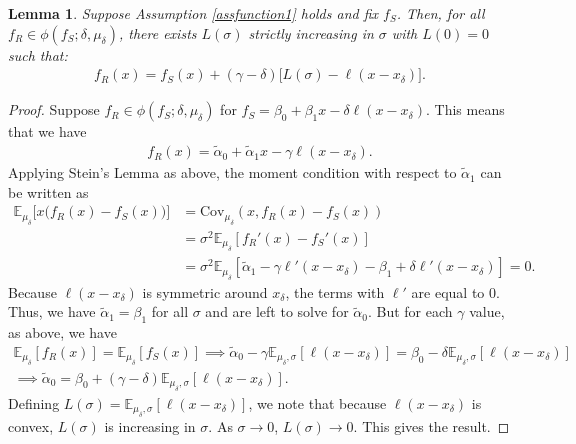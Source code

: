 \documentclass[11pt,dvipsnames]{article}
\newtheorem{lemma}{Lemma}
\newcommand{\Cov}{\mathrm{Cov}}
\begin{document}
\begin{appendix}
\begin{lemma}
Suppose Assumption \ref{assfunction1} holds and fix $f_S$.
Then, for all $f_R \in \phi(f_S;\delta,\mu_\delta)$, there exists $L(\sigma)$ strictly increasing in $\sigma$ with $L(0) = 0$ such that:
\begin{align*}
f_R(x) = f_S(x)+(\gamma-\delta)\big[L(\sigma)-\ell(x-x_\delta)\big].
\end{align*}
\end{lemma}
\begin{proof}
Suppose $f_R \in \phi(f_S;\delta,\mu_\delta)$ for $f_S = \beta_0+\beta_1x-\delta\ell(x-x_\delta)$.
This means that we have
\begin{align*}
f_R(x) = \tilde{\alpha}_0 + \tilde{\alpha}_1 x-\gamma\ell(x-x_\delta).
\end{align*}
Applying Stein's Lemma as above, the moment condition with respect to $\tilde{\alpha}_1$ can be written as
\begin{align*}
\mathbb{E}_{\mu_\delta}\big[x\big(f_R(x)-f_S(x) \big)\big]
&= \Cov_{\mu_\delta}(x,f_R(x)-f_S(x))
\\
&=
\sigma^2 \mathbb{E}_{\mu_\delta}[f_R'(x)-f_S'(x)]
\\
&=
\sigma^2 \mathbb{E}_{\mu_\delta}[\tilde{\alpha}_1-\gamma\ell'(x-x_\delta)-\beta_1+\delta\ell'(x-x_\delta)]
= 0.
\end{align*}
Because $\ell(x-x_\delta)$ is symmetric around $x_\delta$, the terms with $\ell'$ are equal to $0$.
Thus, we have $\tilde{\alpha}_1 = \beta_1$ for all $\sigma$ and are left to solve for $\tilde{\alpha}_0$.
But for each $\gamma$ value, as above, we have
\begin{align*}
\mathbb{E}_{\mu_\delta}[f_R(x)]=\mathbb{E}_{\mu_\delta}[f_S(x)]
\implies
\tilde{\alpha}_0 - \gamma\mathbb{E}_{\mu_\delta,\sigma}[\ell(x-x_\delta)]
= \beta_0 - \delta\mathbb{E}_{\mu_\delta,\sigma}[\ell(x-x_\delta)]
\\
\implies
\tilde{\alpha}_0 = \beta_0 + (\gamma-\delta)\mathbb{E}_{\mu_\delta,\sigma}[\ell(x-x_\delta)].
\end{align*}
Defining $L(\sigma) = \mathbb{E}_{\mu_\delta,\sigma}[\ell(x-x_\delta)]$, we note that because $\ell(x-x_\delta)$ is convex, $L(\sigma)$ is increasing in $\sigma$. As $\sigma \to 0$, $L(\sigma) \to 0$.
This gives the result.	
\end{proof}


\end{appendix}
\end{document}
